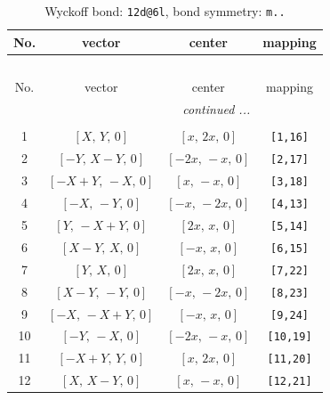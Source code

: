 \documentclass[fleqn,8pt]{jsarticle}
\begin{document}
\begin{longtable}{cccc}
\caption{Wyckoff bond: {\tt 12d@6l}, bond symmetry: {\tt m..}}
 \\
 \hline \hline
No. & vector & center & mapping \\ \hline \endfirsthead

\multicolumn{3}{l}{\tablename\ \thetable{}} \\
 \hline \hline
No. & vector & center & mapping \\ \hline \endhead

 \hline \hline
\multicolumn{3}{r}{\footnotesize\it continued ...} \\ \endfoot

 \hline \hline
\multicolumn{3}{r}{} \\ \endlastfoot

1 & $\left[ X,\, Y,\, 0 \right]$ & $\left[ x,\, 2 x,\, 0 \right]$ & {\tt [1,16]} \\ \hline
2 & $\left[ - Y,\, X - Y,\, 0 \right]$ & $\left[ - 2 x,\, - x,\, 0 \right]$ & {\tt [2,17]} \\ \hline
3 & $\left[ - X + Y,\, - X,\, 0 \right]$ & $\left[ x,\, - x,\, 0 \right]$ & {\tt [3,18]} \\ \hline
4 & $\left[ - X,\, - Y,\, 0 \right]$ & $\left[ - x,\, - 2 x,\, 0 \right]$ & {\tt [4,13]} \\ \hline
5 & $\left[ Y,\, - X + Y,\, 0 \right]$ & $\left[ 2 x,\, x,\, 0 \right]$ & {\tt [5,14]} \\ \hline
6 & $\left[ X - Y,\, X,\, 0 \right]$ & $\left[ - x,\, x,\, 0 \right]$ & {\tt [6,15]} \\ \hline
7 & $\left[ Y,\, X,\, 0 \right]$ & $\left[ 2 x,\, x,\, 0 \right]$ & {\tt [7,22]} \\ \hline
8 & $\left[ X - Y,\, - Y,\, 0 \right]$ & $\left[ - x,\, - 2 x,\, 0 \right]$ & {\tt [8,23]} \\ \hline
9 & $\left[ - X,\, - X + Y,\, 0 \right]$ & $\left[ - x,\, x,\, 0 \right]$ & {\tt [9,24]} \\ \hline
10 & $\left[ - Y,\, - X,\, 0 \right]$ & $\left[ - 2 x,\, - x,\, 0 \right]$ & {\tt [10,19]} \\ \hline
11 & $\left[ - X + Y,\, Y,\, 0 \right]$ & $\left[ x,\, 2 x,\, 0 \right]$ & {\tt [11,20]} \\ \hline
12 & $\left[ X,\, X - Y,\, 0 \right]$ & $\left[ x,\, - x,\, 0 \right]$ & {\tt [12,21]} \\
\end{longtable}
\renewcommand{\arraystretch}{1.2}
\end{document}
